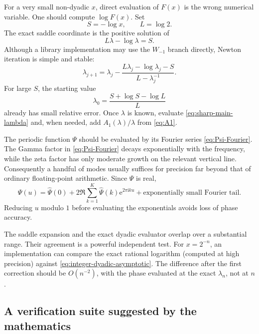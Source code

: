 \documentclass[11pt,oneside]{article}
\theoremstyle{definition}
\theoremstyle{remark}
\newcommand{\e}{\mathrm e}
\newcommand{\ii}{\mathrm i}
\begin{document}
For a very small non-dyadic $x$, direct evaluation of $F(x)$ is the wrong numerical
variable.  One should compute $\log F(x)$.  Set
\begin{equation}
 S=-\log x,\qquad L=\log2.
\end{equation}
The exact saddle coordinate is the positive solution of
\begin{equation}
 L\lambda-\log\lambda=S.                                  \label{eq:lambda-log-equation}
\end{equation}
Although a library implementation may use the $W_{-1}$ branch directly, Newton iteration is
simple and stable:
\begin{equation}
 \lambda_{j+1}
 =
 \lambda_j-
 \frac{L\lambda_j-\log\lambda_j-S}{L-\lambda_j^{-1}}.     \label{eq:lambda-newton}
\end{equation}
For large $S$, the starting value
\begin{equation}
 \lambda_0=\frac{S+\log S-\log L}{L}                       \label{eq:lambda-start}
\end{equation}
already has small relative error.  Once $\lambda$ is known, evaluate
\eqref{eq:sharp-main-lambda} and, when needed, add $A_1(\lambda)/\lambda$ from
\eqref{eq:A1}.

The periodic function $\Psi$ should be evaluated by its Fourier series
\eqref{eq:Psi-Fourier}.  The Gamma factor in
\eqref{eq:Psi-Fourier} decays exponentially with the frequency, while the zeta factor
has only moderate growth on the relevant vertical line.  Consequently a handful of modes
usually suffices for precision far beyond that of ordinary floating-point arithmetic.  Since
$\Psi$ is real,
\begin{equation}
 \Psi(u)=\widehat\Psi(0)
 +2\Re\sum_{k=1}^{K}\widehat\Psi(k)\e^{2\pi\ii ku}
 +\text{exponentially small Fourier tail}.                \label{eq:Psi-numerical}
\end{equation}
Reducing $u$ modulo $1$ before evaluating the exponentials avoids loss of phase accuracy.

The saddle expansion and the exact dyadic evaluator overlap over a substantial range.
Their agreement is a powerful independent test.  For $x=2^{-n}$, an implementation can
compare the exact rational logarithm (computed at high precision) against
\eqref{eq:integer-dyadic-asymptotic}.  The difference after the first correction should be
$O(n^{-2})$, with the phase evaluated at the exact $\lambda_n$, not at $n$.

\subsection{A verification suite suggested by the mathematics}
\end{document}
